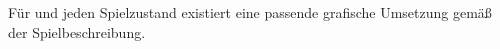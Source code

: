 F\"ur \everyObject{} und jeden Spielzustand existiert eine passende grafische Umsetzung gem\"a\ss{} der Spielbeschreibung.
